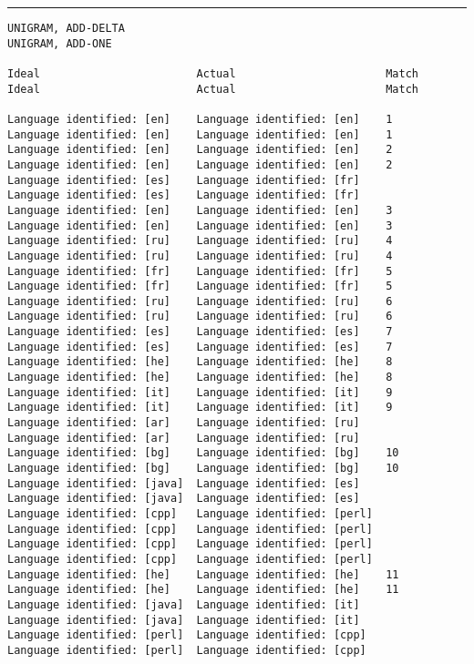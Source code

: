 \tiny
\hrule\vskip4pt
\begin{verbatim}
UNIGRAM, ADD-DELTA                                                 UNIGRAM, ADD-ONE

Ideal                        Actual                       Match    Ideal                        Actual                       Match

Language identified: [en]    Language identified: [en]    1        Language identified: [en]    Language identified: [en]    1
Language identified: [en]    Language identified: [en]    2        Language identified: [en]    Language identified: [en]    2
Language identified: [es]    Language identified: [fr]             Language identified: [es]    Language identified: [fr]
Language identified: [en]    Language identified: [en]    3        Language identified: [en]    Language identified: [en]    3
Language identified: [ru]    Language identified: [ru]    4        Language identified: [ru]    Language identified: [ru]    4
Language identified: [fr]    Language identified: [fr]    5        Language identified: [fr]    Language identified: [fr]    5
Language identified: [ru]    Language identified: [ru]    6        Language identified: [ru]    Language identified: [ru]    6
Language identified: [es]    Language identified: [es]    7        Language identified: [es]    Language identified: [es]    7
Language identified: [he]    Language identified: [he]    8        Language identified: [he]    Language identified: [he]    8
Language identified: [it]    Language identified: [it]    9        Language identified: [it]    Language identified: [it]    9
Language identified: [ar]    Language identified: [ru]             Language identified: [ar]    Language identified: [ru]
Language identified: [bg]    Language identified: [bg]    10       Language identified: [bg]    Language identified: [bg]    10
Language identified: [java]  Language identified: [es]             Language identified: [java]  Language identified: [es]
Language identified: [cpp]   Language identified: [perl]           Language identified: [cpp]   Language identified: [perl]
Language identified: [cpp]   Language identified: [perl]           Language identified: [cpp]   Language identified: [perl]
Language identified: [he]    Language identified: [he]    11       Language identified: [he]    Language identified: [he]    11
Language identified: [java]  Language identified: [it]             Language identified: [java]  Language identified: [it]
Language identified: [perl]  Language identified: [cpp]            Language identified: [perl]  Language identified: [cpp]

\end{verbatim}
